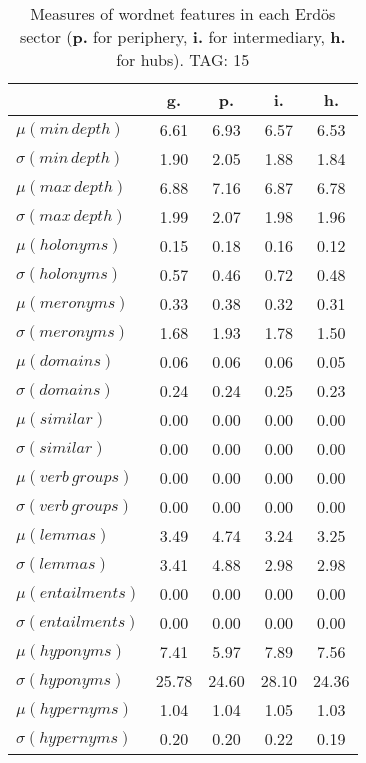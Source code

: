 \begin{table}[h!]
\begin{center}
\begin{tabular}{| l | c | c | c | c |}\hline
 & g. & p. & i. & h. \\\hline
$\mu(min\,depth)$ & 6.61  & 6.93  & 6.57  & 6.53 \\\hline
$\sigma(min\,depth)$ & 1.90  & 2.05  & 1.88  & 1.84 \\\hline
$\mu(max\,depth)$ & 6.88  & 7.16  & 6.87  & 6.78 \\\hline
$\sigma(max\,depth)$ & 1.99  & 2.07  & 1.98  & 1.96 \\\hline
$\mu(holonyms)$ & 0.15  & 0.18  & 0.16  & 0.12 \\\hline
$\sigma(holonyms)$ & 0.57  & 0.46  & 0.72  & 0.48 \\\hline
$\mu(meronyms)$ & 0.33  & 0.38  & 0.32  & 0.31 \\\hline
$\sigma(meronyms)$ & 1.68  & 1.93  & 1.78  & 1.50 \\\hline
$\mu(domains)$ & 0.06  & 0.06  & 0.06  & 0.05 \\\hline
$\sigma(domains)$ & 0.24  & 0.24  & 0.25  & 0.23 \\\hline
$\mu(similar)$ & 0.00  & 0.00  & 0.00  & 0.00 \\\hline
$\sigma(similar)$ & 0.00  & 0.00  & 0.00  & 0.00 \\\hline
$\mu(verb\,groups)$ & 0.00  & 0.00  & 0.00  & 0.00 \\\hline
$\sigma(verb\,groups)$ & 0.00  & 0.00  & 0.00  & 0.00 \\\hline
$\mu(lemmas)$ & 3.49  & 4.74  & 3.24  & 3.25 \\\hline
$\sigma(lemmas)$ & 3.41  & 4.88  & 2.98  & 2.98 \\\hline
$\mu(entailments)$ & 0.00  & 0.00  & 0.00  & 0.00 \\\hline
$\sigma(entailments)$ & 0.00  & 0.00  & 0.00  & 0.00 \\\hline
$\mu(hyponyms)$ & 7.41  & 5.97  & 7.89  & 7.56 \\\hline
$\sigma(hyponyms)$ & 25.78  & 24.60  & 28.10  & 24.36 \\\hline
$\mu(hypernyms)$ & 1.04  & 1.04  & 1.05  & 1.03 \\\hline
$\sigma(hypernyms)$ & 0.20  & 0.20  & 0.22  & 0.19 \\\hline
\end{tabular}
\caption{Measures of wordnet features in each Erd\"os sector ({{\bf p.}} for periphery, {{\bf i.}} for intermediary, {{\bf h.}} for hubs). TAG: 15}
\end{center}
\end{table}